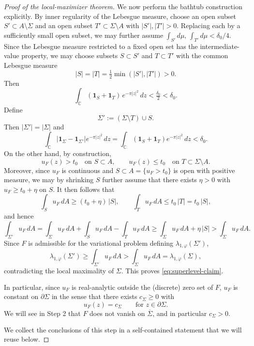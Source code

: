 \documentclass[a4paper,11pt,reqno]{amsart}
\numberwithin{equation}{section}
\theoremstyle{plain} %
\theoremstyle{definition} %
\theoremstyle{remark}
\newcommand{\C}{\mathbb{C}}
\begin{document}
\begin{proof}[Proof of the local-maximizer theorem]
We now perform the bathtub construction explicitly. By inner regularity of the
Lebesgue measure, choose an open subset
\(S'\subset A\setminus\Sigma\) and an open subset
\(T'\subset \Sigma\setminus A\) with \(|S'|,|T'|>0\). Replacing each by a
sufficiently small open subset, we may further assume
\(\int_{S'}d\mu,\,\int_{T'}d\mu<\delta_0/4\). Since the Lebesgue measure
restricted to a fixed open set has the intermediate-value property, we may
choose subsets \(S\subset S'\) and \(T\subset T'\) with the common Lebesgue
measure
\[
|S|=|T|=\tfrac12\min(|S'|,|T'|)>0.
\]
Then
\[
\int_\C (\mathbf 1_S+\mathbf 1_T)\,e^{-\pi |z|^2}\,dz<\tfrac{\delta_0}{2}<\delta_0.
\]
Define
\[
\Sigma':=(\Sigma\setminus T)\cup S.
\]
Then \(|\Sigma'|=|\Sigma|\) and
\[
\int_\C |\mathbf 1_\Sigma-\mathbf 1_{\Sigma'}|e^{-\pi |z|^2}\,dz
=\int_\C(\mathbf 1_S+\mathbf 1_T)e^{-\pi|z|^2}\,dz<\delta_0.
\]
On the other hand, by construction,
\[
u_F(z)>t_0 \quad \text{on } S\subset A,
\qquad
u_F(z)\le t_0 \quad \text{on } T\subset \Sigma\setminus A.
\]
Moreover, since \(u_F\) is continuous and \(S\subset A=\{u_F>t_0\}\) is open
with positive measure, we may by shrinking \(S\) further assume that there
exists \(\eta>0\) with \(u_F\ge t_0+\eta\) on \(S\). It then follows that
\[
\int_S u_F\,dA \ge (t_0+\eta)\,|S|,
\qquad
\int_T u_F\,dA \le t_0\,|T|=t_0\,|S|,
\]
and hence
\[
\int_{\Sigma'} u_F\,dA
=
\int_\Sigma u_F\,dA + \int_S u_F\,dA-\int_T u_F\,dA
\ge \int_\Sigma u_F\,dA + \eta\,|S|
>
\int_\Sigma u_F\,dA.
\]
Since \(F\) is admissible for the variational problem defining
\(\lambda_{1,\varphi}(\Sigma')\),
\[
\lambda_{1,\varphi}(\Sigma')
\ge \int_{\Sigma'} u_F\,dA
>
\int_\Sigma u_F\,dA
=
\lambda_{1,\varphi}(\Sigma),
\]
contradicting the local maximality of \(\Sigma\). This proves
\eqref{eq:superlevel-claim}.

In particular, since \(u_F\) is real-analytic outside the (discrete) zero set of
\(F\), \(u_F\) is constant on \(\partial \Sigma\) in the sense that there exists
\(c_\Sigma\ge 0\) with
\begin{equation}\label{eq:boundary-level-set-new}
u_F(z)=c_\Sigma
\qquad \text{for } z\in \partial \Sigma.
\end{equation}
We will see in Step 2 that \(F\) does not vanish on \(\overline\Sigma\), and in
particular \(c_\Sigma>0\).

We collect the conclusions of this step in a self-contained statement that we
will reuse below.


\end{proof}
\end{document}
